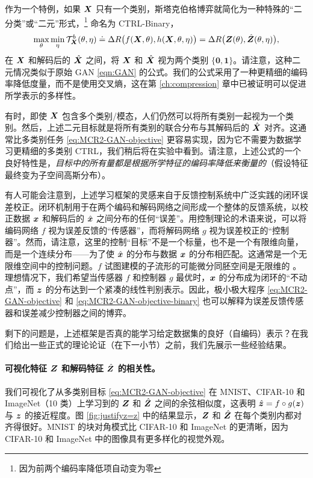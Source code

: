 \documentclass[../../book-main_zh.tex]{subfiles}
\begin{document}
作为一个特例，如果 $\bm{X}$ 只有一个类别，斯塔克伯格博弈就简化为一种特殊的“二分类”或“二元”形式，\footnote{因为前两个编码率降低项自动变为零} 命名为 CTRL-Binary，
\begin{equation}
 \max_\theta \min_\eta \mathcal{T}^b_{\bm{X}}(\theta, \eta) \doteq \Delta R\big(f(\bm{X},\theta), h(\bm{X},\theta,\eta)\big) = \Delta R\big(\bm{Z}(\theta), \hat {\bm{Z}}(\theta, \eta)\big), 
    \label{eq:MCR2-GAN-objective-binary}
\end{equation}
在 $\bm{X}$ 和解码后的 $\hat{\bm{X}}$ 之间，将 $\bm{X}$ 和 $\hat {\bm{X}}$ 视为两个类别 $\{\bm 0, \bm 1\}$。请注意，这种二元情况类似于原始 GAN \eqref{eqn:GAN} 的公式。我们的公式采用了一种更精细的编码率降低度量，而不是使用交叉熵，这在第 \ref{ch:compression} 章中已被证明可以促进所学表示的多样性。

有时，即使 $\bm{X}$ 包含多个类别/模态，人们仍然可以将所有类别一起视为一个类别。然后，上述二元目标就是将所有类别的联合分布与其解码后的 $\hat {\bm{X}}$ 对齐。这通常比多类别任务 \eqref{eq:MCR2-GAN-objective} 更容易实现，因为它不需要为数据学习更精细的多类别 CTRL，我们稍后将在实验中看到。请注意，上述公式的一个良好特性是，{\em 目标中的所有量都是根据所学特征的编码率降低来衡量的}（假设特征最终变为子空间高斯分布）。

有人可能会注意到，上述学习框架的灵感来自于反馈控制系统中广泛实践的闭环误差校正。闭环机制用于在两个编码和解码网络之间形成一个整体的反馈系统，以校正数据 $\bm{x}$ 和解码后的 $\hat {\bm{x}}$ 之间分布的任何“误差”。用控制理论的术语来说，可以将编码网络 $f$ 视为误差反馈的“传感器”，而将解码网络 $g$ 视为误差校正的“控制器”。然而，请注意，这里的控制“目标”不是一个标量，也不是一个有限维向量，而是一个连续分布——为了使 $\hat {\bm{x}}$ 的分布与数据 $\bm{x}$ 的分布相匹配。这通常是一个无限维空间中的控制问题。$f$ 试图建模的子流形的可能微分同胚空间是无限维的 \cite{Lee2002IntroductionTS}。理想情况下，我们希望当传感器 $f$ 和控制器 $g$ 最优时，$\bm{x}$ 的分布成为闭环的“不动点”，而 $\bm{z}$ 的分布达到一个紧凑的线性判别表示。因此，极小极大程序 \eqref{eq:MCR2-GAN-objective} 和 \eqref{eq:MCR2-GAN-objective-binary} 也可以解释为误差反馈传感器和误差减少控制器之间的博弈。

剩下的问题是，上述框架是否真的能学习给定数据集的良好（自编码）表示？在我们给出一些正式的理论论证（在下一小节）之前，我们先展示一些经验结果。

\paragraph{可视化特征 $\bm{Z}$ 和解码特征 $\hat {\bm{Z}}$ 的相关性。} 我们可视化了从多类别目标 \eqref{eq:MCR2-GAN-objective} 在 MNIST、CIFAR-10 和 ImageNet（10 类）上学习到的 $\bm{Z}$ 和 $\hat{\bm{Z}}$ 之间的余弦相似度，这表明 $\hat{\bm{z}} = f\circ g(\bm{z})$ 与 $\bm{z}$ 的接近程度。图 \ref{fig:justifyz=z} 中的结果显示，$\bm{Z}$ 和 $\hat{\bm{Z}}$ 在每个类别内都对齐得很好。MNIST 的块对角模式比 CIFAR-10 和 ImageNet 的更清晰，因为 CIFAR-10 和 ImageNet 中的图像具有更多样化的视觉外观。
\end{document}

